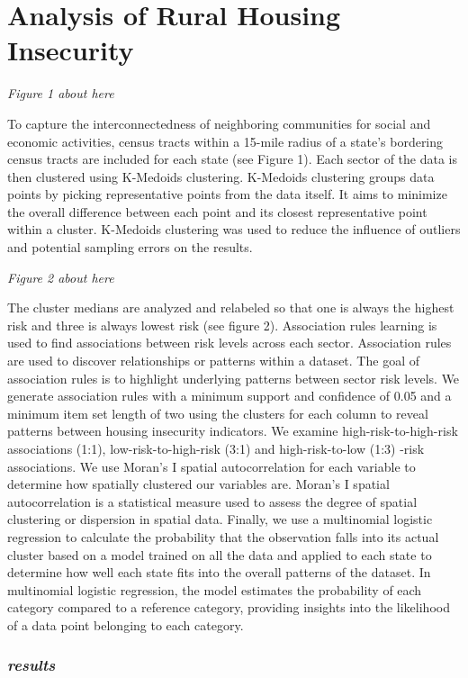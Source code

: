 \chapter{Analysis of Rural Housing Insecurity}	

\textit{Figure 1 about here}

To capture the interconnectedness of neighboring communities for social and economic activities, census tracts within a 15-mile radius of a state’s bordering census tracts are included for each state (see Figure 1). Each sector of the data is then clustered using K-Medoids clustering. K-Medoids clustering groups data points by picking representative points from the data itself. It aims to minimize the overall difference between each point and its closest representative point within a cluster.  K-Medoids clustering was used to reduce the influence of outliers and potential sampling errors on the results.  


\textit{Figure 2 about here}

The cluster medians are analyzed and relabeled so that one is always the highest risk and three is always lowest risk (see figure 2). Association rules learning is used to find associations between risk levels across each sector. Association rules are used to discover relationships or patterns within a dataset. The goal of association rules is to highlight underlying patterns between sector risk levels. We generate association rules with a minimum support and confidence of 0.05 and a minimum item set length of two using the clusters for each column to reveal patterns between housing insecurity indicators. We examine high-risk-to-high-risk associations (1:1), low-risk-to-high-risk (3:1) and high-risk-to-low (1:3) -risk associations. We use Moran’s I spatial autocorrelation for each variable to determine how spatially clustered our variables are. Moran's I spatial autocorrelation is a statistical measure used to assess the degree of spatial clustering or dispersion in spatial data. Finally, we use a multinomial logistic regression to calculate the probability that the observation falls into its actual cluster based on a model trained on all the data and applied to each state to determine how well each state fits into the overall patterns of the dataset. In multinomial logistic regression, the model estimates the probability of each category compared to a reference category, providing insights into the likelihood of a data point belonging to each category. 

\subsection{\textit{results}}

